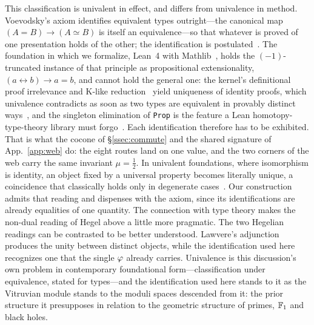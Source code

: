 This classification is univalent in effect, and differs from univalence in method. Voevodsky's axiom identifies equivalent types outright---the canonical map $(A=B)\to(A\simeq B)$ is itself an equivalence---so that whatever is proved of one presentation holds of the other; the identification is postulated~\cite{HoTTbook}. The foundation in which we formalize, Lean~4 with Mathlib~\cite{deMouraUllrich21,mathlib20}, holds the $(-1)$-truncated instance of that principle as propositional extensionality, $(a\leftrightarrow b)\to a=b$, and cannot hold the general one: the kernel's definitional proof irrelevance and K-like reduction~\cite{Vaishnav25} yield uniqueness of identity proofs, which univalence contradicts as soon as two types are equivalent in provably distinct ways~\cite{Gilbert19}, and the singleton elimination of \texttt{Prop} is the feature a Lean homotopy-type-theory library must forgo~\cite{vanDoorn18}. Each identification therefore has to be exhibited. That is what the cocone of \S\ref{ssec:commute} and the shared signature of App.~\ref{app:web} do: the eight routes land on one value, and the two corners of the web carry the same invariant $\mu=\tfrac12$. In univalent foundations, where isomorphism is identity, an object fixed by a universal property becomes literally unique, a coincidence that classically holds only in degenerate cases~\cite{AhrensKapulkinShulman15}. Our construction admits that reading and dispenses with the axiom, since its identifications are already equalities of one quantity. The connection with type theory makes the non-dual reading of Hegel above a little more pragmatic. The two Hegelian readings can be contrasted to be better understood. Lawvere's adjunction produces the unity between distinct objects, while the identification used here recognizes one that the single $\varphi$ already carries. Univalence is this discussion's own problem in contemporary foundational form---classification under equivalence, stated for types---and the identification used here stands to it as the Vitruvian module stands to the moduli spaces descended from it: the prior structure it presupposes in relation to the geometric structure of primes, $\mathbb{F}_1$ and black holes.

